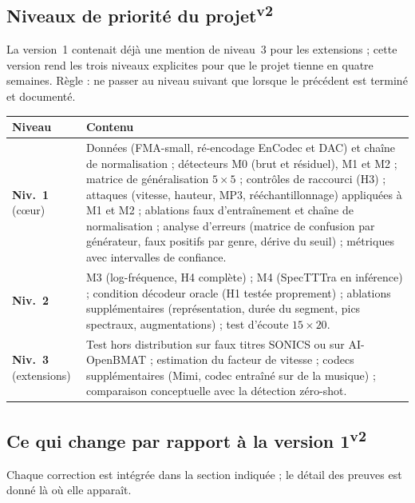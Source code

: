 \documentclass[11pt,a4paper]{article}
\providecommand{\og}{\guillemotleft\nobreakspace}%
\providecommand{\fg}{\nobreakspace\guillemotright}}
\newcommand{\vtwo}{\textsuperscript{\textcolor{orange!80!black}{\textbf{v2}}}}
\newcommand{\nA}{\textbf{Niv.~1}}  %
\newcommand{\nB}{\textbf{Niv.~2}}  %
\newcommand{\nC}{\textbf{Niv.~3}}  %
\begin{document}
\subsection{Niveaux de priorité du projet\vtwo}\label{sec:niveaux}
La version~1 contenait déjà une mention de \og{}niveau~3\fg{} pour les extensions ; cette version rend les trois niveaux explicites pour que le projet tienne en quatre semaines. Règle : ne passer au niveau suivant que lorsque le précédent est terminé et documenté.

{\small
\begin{longtable}{L{1.7cm}L{13.8cm}}
\toprule
\textbf{Niveau} & \textbf{Contenu}\\
\midrule
\endhead
\bottomrule
\endfoot
\nA{} (c\oe{}ur) &
Données (FMA-small, ré-encodage EnCodec et DAC) et chaîne de normalisation ; détecteurs M0 (brut et résiduel), M1 et M2 ; matrice de généralisation $5\times5$ ; contrôles de raccourci (H3) ; attaques (vitesse, hauteur, MP3, rééchantillonnage) appliquées à M1 et M2 ; ablations \og{}faux d'entraînement\fg{} et \og{}chaîne de normalisation\fg{} ; analyse d'erreurs (matrice de confusion par générateur, faux positifs par genre, dérive du seuil) ; métriques avec intervalles de confiance.\\
\nB{} &
M3 (log-fréquence, H4 complète) ; M4 (SpecTTTra en inférence) ; condition \og{}décodeur oracle\fg{} (H1 testée proprement) ; ablations supplémentaires (représentation, durée du segment, pics spectraux, augmentations) ; test d'écoute $15\times20$.\\
\nC{} (extensions) &
Test hors distribution sur faux titres SONICS ou sur AI-OpenBMAT ; estimation du facteur de vitesse ; codecs supplémentaires (Mimi, codec entraîné sur de la musique) ; comparaison conceptuelle avec la détection \og{}zéro-shot\fg{}.\\
\end{longtable}}

\subsection{Ce qui change par rapport à la version 1\vtwo}\label{sec:changes}
Chaque correction est intégrée dans la section indiquée ; le détail des preuves est donné là où elle apparaît.
\end{document}
